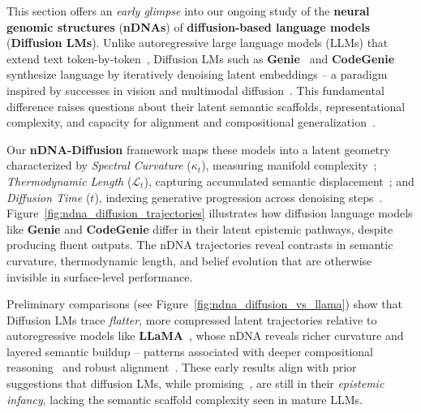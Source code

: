 \vspace{-2mm}
\noindent
This section offers an \emph{early glimpse} into our ongoing study of the \textbf{neural genomic structures} (\textbf{nDNAs}) of \textbf{diffusion-based language models} (\textbf{Diffusion LMs}). Unlike autoregressive large language models (LLMs) that extend text token-by-token~\citep{brown2020gpt3, touvron2023llama, chowdhery2022palm}, Diffusion LMs such as \textbf{Genie}~\citep{genie2024openlm} and \textbf{CodeGenie}~\citep{codegenie2024openlm} synthesize language by iteratively denoising latent embeddings -- a paradigm inspired by successes in vision and multimodal diffusion~\citep{ho2020denoising, saharia2022photorealistic, nichol2021glide}. This fundamental difference raises questions about their latent semantic scaffolds, representational complexity, and capacity for alignment and compositional generalization~\citep{li2022diffusiondb, yang2023diffusionlm, ge2023diffusionllm}.  

Our \textbf{nDNA-Diffusion} framework maps these models into a latent geometry characterized by \emph{Spectral Curvature} ($\kappa_t$), measuring manifold complexity~\citep{belkin2003laplacian, coifman2006diffusion}; \emph{Thermodynamic Length} ($\mathcal{L}_t$), capturing accumulated semantic displacement~\citep{crooks2007measuring, sivak2012thermodynamic}; and \emph{Diffusion Time} ($t$), indexing generative progression across denoising steps~\citep{ho2020denoising, nichol2021glide}. Figure~\ref{fig:ndna_diffusion_trajectories} illustrates how diffusion language models like \textbf{Genie} and \textbf{CodeGenie} differ in their latent epistemic pathways, despite producing fluent outputs. The nDNA trajectories reveal contrasts in semantic curvature, thermodynamic length, and belief evolution that are otherwise invisible in surface-level performance.


Preliminary comparisons (see Figure~\ref{fig:ndna_diffusion_vs_llama}) show that Diffusion LMs trace \emph{flatter}, more compressed latent trajectories relative to autoregressive models like \textbf{LLaMA}~\citep{touvron2023llama}, whose nDNA reveals richer curvature and layered semantic buildup -- patterns associated with deeper compositional reasoning~\citep{wei2022chain, nye2021improving} and robust alignment~\citep{ouyang2022training, ganguli2023reducing}. These early results align with prior suggestions that diffusion LMs, while promising~\citep{ge2023diffusionllm}, are still in their \emph{epistemic infancy}, lacking the semantic scaffold complexity seen in mature LLMs.  

